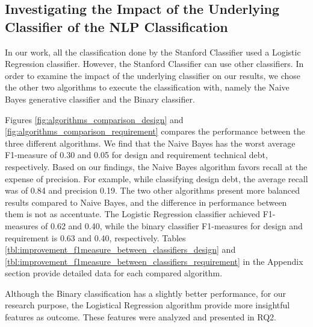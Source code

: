 \subsection{Investigating the Impact of the Underlying Classifier of the NLP Classification}

In our work, all the classification done by the Stanford Classifier used a Logistic Regression classifier. However, the Stanford Classifier can use other classifiers. In order to examine the impact of the underlying classifier on our results, we chose the other two algorithms to execute the classification with, namely the Naive Bayes generative classifier and the Binary classifier.

Figures \ref{fig:algorithms_comparison_design} and \ref{fig:algorithms_comparison_requirement} compares the performance between the three different algorithms. We find that the Naive Bayes has the worst average F1-measure of 0.30 and 0.05 for design and requirement technical debt, respectively. Based on our findings, the Naive Bayes algorithm favors recall at the expense of precision. For example, while classifying design debt, the average recall was of 0.84 and precision 0.19. The two other algorithms present more balanced results compared to Naive Bayes, and the difference in performance between them is not as accentuate. The Logistic Regression classifier achieved F1-measures of 0.62 and 0.40, while the binary classifier F1-measures for design and requirement \SATD is 0.63 and 0.40, respectively. Tables \ref{tbl:improvement_f1measure_between_classifiers_design} and \ref{tbl:improvement_f1measure_between_classifiers_requirement} in the Appendix section provide detailed data for each compared algorithm.  

Although the Binary classification has a slightly better performance, for our research purpose, the Logistical Regression algorithm provide more insightful features as outcome. These features were analyzed and presented in RQ2. 
